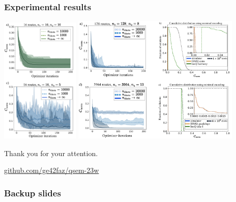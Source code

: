 \documentclass {beamer}
\begin{document}
\begin {frame}
\frametitle {Experimental results}

\begin {center}
\includegraphics[width=0.28\textwidth] {2fig}
\includegraphics[width=0.6\textwidth] {4fig}
\cite{effvrp}
\end {center}

\end {frame}

\begin {frame}
\centering
Thank you for your attention.

\vfill
\url {github.com/ge42faz/qsem-23w}
\end {frame}

\begin {frame}
\frametitle {Backup slides}
\end {frame}
\end{document}
